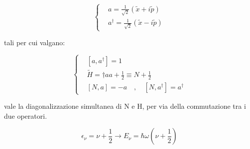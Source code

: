 \documentclass{article}
\begin{document}
\begin{equation}
    \left\{
    \begin{aligned}
         & a= \frac{1}{\sqrt{2}}(\tilde{x}+i\tilde{p})           \\
         & a^{\dagger}= \frac{1}{\sqrt{2}}(\tilde{x}-i\tilde{p})
    \end{aligned}
    \right.
\end{equation}

tali per cui valgano:

\begin{equation}
    \left\{
    \begin{aligned}
         & [a,a^{\dagger}]=1                                    \\
         & \tilde{H}=\dagger aa+\frac{1}{2}\equiv N+\frac{1}{2} \\
         & [N,a]=-a \quad , \quad [N,a^{\dagger}]=a^{\dagger}
    \end{aligned}
    \right.
\end{equation}

vale la diagonalizzazione simultanea di N e H, per via della commutazione tra i due operatori.

\begin{equation}
    \epsilon_\nu=\nu+\frac{1}{2} \rightarrow E_\nu=\hbar \omega(\nu+\frac{1}{2})
\end{equation}
\end{document}
